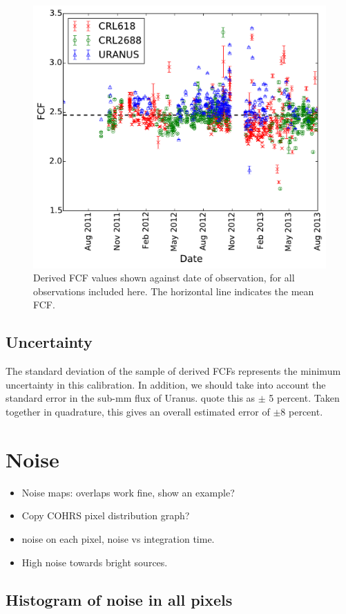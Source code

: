 \documentclass[twocolumn]{aastex6}
\begin{document}
\begin{figure}
  \centering
  \includegraphics[width=0.7\linewidth]{Legacy_calibration_vsdate}
  \caption{Derived FCF values shown against date of observation, for
    all observations included here. The horizontal line indicates the mean FCF.}
  \label{fig:calibvstime}
\end{figure}

\subsection{Uncertainty}

The standard deviation of the sample of derived FCFs represents the
minimum uncertainty in this calibration. In addition, we should take
into account the standard error in the sub-mm flux of
Uranus. \citet{Dempsey2013} quote this as $\pm$ 5 percent. Taken
together in quadrature, this gives an overall estimated error of
$\pm$8 percent.



\section{Noise}

\begin{itemize}
\item Noise maps: overlaps work fine, show an example? 
\item Copy COHRS pixel distribution graph?
\item noise on each pixel, noise vs integration time.
\item High noise towards bright sources.
\end{itemize}

\subsection{Histogram of noise in all pixels}
\end{document}
